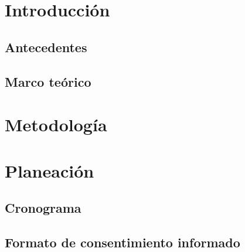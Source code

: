 \documentclass[12pt,letterpaper,spanish, twoside]{report}
\title{}
\author{Omar Pi\~na Ram\'irez}
\begin{document}
 

\chapter{Introducción}
  

\section{Antecedentes}

\section{Marco teórico}

\chapter{Metodología}

\appendix
\chapter{Planeación}
 \section{Cronograma}
 \section{Formato de consentimiento informado}

\newpage

\printbibliography

%
\end{document}
